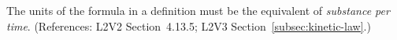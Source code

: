 The units of the  formula in a \KineticLaw definition must be
the equivalent of \emph{substance per time}.  (References: L2V2
Section~4.13.5; L2V3 Section~\ref{subsec:kinetic-law}.)
